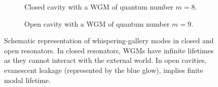 \begin{figure}
  \centering
  \begin{subfigure}[b]{0.45\textwidth}
    \begin{center}
    \end{center}
  \caption{Closed cavity with a WGM of quantum number $m=8$.}
  \end{subfigure}
  \begin{subfigure}[b]{0.45\textwidth}
    \begin{center}
    \end{center}
  \caption{Open cavity with a WGM of quantum number $m=9$.}
  \end{subfigure}

\caption[Schematic representation of whispering-gallery modes]
	{Schematic representation of whispering-gallery modes in closed
	and open resonators. In closed resonators, WGMs have infinite lifetimes
	as they cannot interact with the external world. In open cavities, evanescent
	leakage (represented by the blue glow), implies finite modal lifetime.}
\label{fig:intro.whisperingGalleryWaves}
\end{figure}

